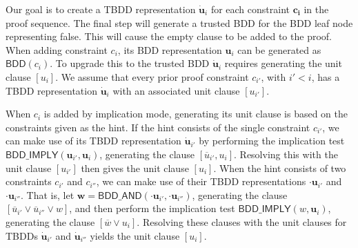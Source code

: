 \documentclass{fmcad}
\begin{document}
Our goal is to create a TBDD representation $\mathbf{\dot{u}}_i$ for each constraint $\mathbf{c_i}$
in the proof sequence. The final step will generate a trusted BDD for the BDD leaf node representing
false. This will cause the empty clause to be added to the proof. When adding constraint $c_i$, its
BDD representation $\mathbf{u}_i$ can be generated as $\mathsf{BDD}(c_i)$. To upgrade this to the
trusted BDD $\mathbf{\dot{u}}_i$ requires generating the unit clause $[u_i]$. We assume that
every prior proof constraint $c_{i'}$, with $i' < i$, has a TBDD representation $\mathbf{\dot{u}}_i$
with an associated unit clause $[u_{i'}]$.

When $c_i$ is added by implication mode, generating its unit clause is based on the constraints
given as the hint. If the hint consists of the single constraint $c_{i'}$, we can make use of its
TBDD representation $\mathbf{\dot{u}}_{i'}$ by performing the implication test
$\mathsf{BDD\_IMPLY}(\mathbf{u}_{i'}, \mathbf{u}_i)$, generating the clause $[\overline{u}_{i'}, u_i]$.
Resolving this with the unit clause $[u_{i'}]$ then gives the unit clause $[u_i]$. When the hint
consists of two constraints $c_{i'}$ and $c_{i''}$, we can make use of their TBDD representations
$\mathbf{\cdot{u}}_{i'}$ and $\mathbf{\cdot{u}}_{i''}$. That is, let
$\mathbf{w} = \mathsf{BDD\_AND}(\mathbf{\cdot{u}}_{i'}, \mathbf{\cdot{u}}_{i''})$, generating the
clause $[\overline{u}_{i'} \lor \overline{u}_{i''} \lor w]$, and then perform the implication test
$\mathsf{BDD\_IMPLY}(w, \mathbf{u}_i)$, generating the clause $[\overline{w} \lor u_i]$. Resolving
these clauses with the unit clauses for TBDDs $\mathbf{\dot{u}}_{i'}$ and $\mathbf{\dot{u}}_{i''}$
yields the unit clause $[u_i]$.
\end{document}

